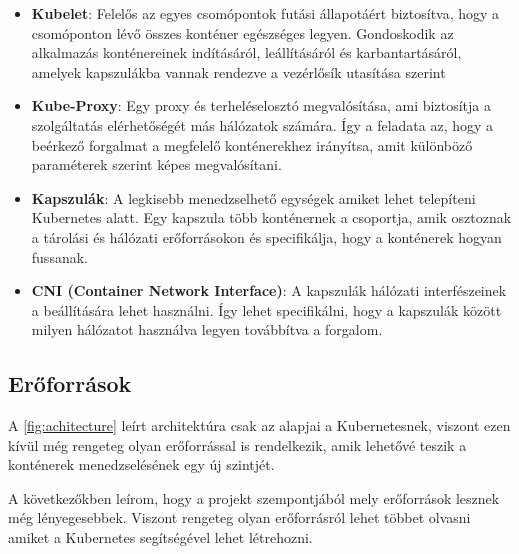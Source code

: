 \begin{itemize}
	\item \textbf{Kubelet}: Felelős az egyes csomópontok futási állapotáért biztosítva, 
	hogy a csomóponton lévő összes konténer egészséges legyen. Gondoskodik az alkalmazás
	konténereinek indításáról, leállításáról és karbantartásáról, amelyek kapszulákba 
	vannak rendezve a vezérlősík utasítása szerint
	\item \textbf{Kube-Proxy}: Egy proxy és terheléselosztó megvalósítása, ami biztosítja
	a szolgáltatás elérhetőségét más hálózatok számára. Így a feladata az, hogy a beérkező
	forgalmat a megfelelő konténerekhez irányítsa, amit különböző paraméterek szerint képes
	megvalósítani.
	\item \textbf{Kapszulák}: A legkisebb menedzselhető egységek amiket lehet telepíteni
	Kubernetes alatt. Egy kapszula több konténernek a csoportja, amik osztoznak a tárolási
	és hálózati erőforrásokon és specifikálja, hogy a konténerek hogyan fussanak. 
	\item \textbf{CNI (Container Network Interface)}: A kapszulák hálózati interfészeinek
	a beállítására lehet használni. Így lehet specifikálni, hogy a kapszulák között 
	milyen hálózatot használva legyen továbbítva a forgalom. 
\end{itemize}

\subsection{Erőforrások}

A \ref{fig:achitecture} leírt architektúra csak az alapjai a Kubernetesnek, viszont ezen kívül
még rengeteg olyan erőforrással is rendelkezik, amik lehetővé teszik a konténerek
menedzselésének egy új szintjét.

A következőkben leírom, hogy a projekt szempontjából mely erőforrások lesznek még
lényegesebbek. Viszont rengeteg olyan erőforrásról lehet többet olvasni \cite{kubeAPI}
amiket a Kubernetes segítségével lehet létrehozni.   

